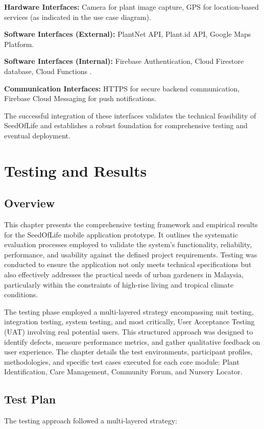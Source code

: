 \documentclass[conference]{IEEEtran}
\begin{document}
\textbf{Hardware Interfaces:} Camera for plant image capture, GPS for location-based services (as indicated in the use case diagram).

\textbf{Software Interfaces (External):} PlantNet API, Plant.id API, Google Maps Platform.

\textbf{Software Interfaces (Internal):} Firebase Authentication, Cloud Firestore database, Cloud Functions \cite{firebase2024}.

\textbf{Communication Interfaces:} HTTPS for secure backend communication, Firebase Cloud Messaging for push notifications.

The successful integration of these interfaces validates the technical feasibility of SeedOfLife and establishes a robust foundation for comprehensive testing and eventual deployment.


\section{Testing and Results}

\subsection{Overview}
This chapter presents the comprehensive testing framework and empirical results for the SeedOfLife mobile application prototype. It outlines the systematic evaluation processes employed to validate the system's functionality, reliability, performance, and usability against the defined project requirements. Testing was conducted to ensure the application not only meets technical specifications but also effectively addresses the practical needs of urban gardeners in Malaysia, particularly within the constraints of high-rise living and tropical climate conditions.

The testing phase employed a multi-layered strategy encompassing unit testing, integration testing, system testing, and most critically, User Acceptance Testing (UAT) involving real potential users. This structured approach was designed to identify defects, measure performance metrics, and gather qualitative feedback on user experience. The chapter details the test environments, participant profiles, methodologies, and specific test cases executed for each core module: Plant Identification, Care Management, Community Forum, and Nursery Locator.

\subsection{Test Plan}
The testing approach followed a multi-layered strategy:
\end{document}
